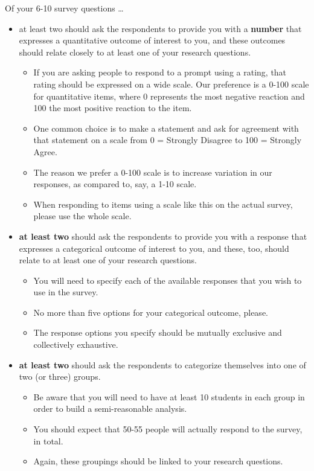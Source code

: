 \documentclass[]{book}
\providecommand{\tightlist}{%
  \setlength{\itemsep}{0pt}\setlength{\parskip}{0pt}}
\theoremstyle{definition}
\theoremstyle{definition}
\theoremstyle{definition}
\theoremstyle{remark}
\begin{document}
Of your 6-10 survey questions \ldots{}

\begin{itemize}
\tightlist
\item
  at least two should ask the respondents to provide you with a
  \textbf{number} that expresses a quantitative outcome of interest to
  you, and these outcomes should relate closely to at least one of your
  research questions.

  \begin{itemize}
  \tightlist
  \item
    If you are asking people to respond to a prompt using a rating, that
    rating should be expressed on a wide scale. Our preference is a
    0-100 scale for quantitative items, where 0 represents the most
    negative reaction and 100 the most positive reaction to the item.
  \item
    One common choice is to make a statement and ask for agreement with
    that statement on a scale from 0 = Strongly Disagree to 100 =
    Strongly Agree.
  \item
    The reason we prefer a 0-100 scale is to increase variation in our
    responses, as compared to, say, a 1-10 scale.
  \item
    When responding to items using a scale like this on the actual
    survey, please use the whole scale.
  \end{itemize}
\item
  \textbf{at least two} should ask the respondents to provide you with a
  response that expresses a categorical outcome of interest to you, and
  these, too, should relate to at least one of your research questions.

  \begin{itemize}
  \tightlist
  \item
    You will need to specify each of the available responses that you
    wish to use in the survey.
  \item
    No more than five options for your categorical outcome, please.
  \item
    The response options you specify should be mutually exclusive and
    collectively exhaustive.
  \end{itemize}
\item
  \textbf{at least two} should ask the respondents to categorize
  themselves into one of two (or three) groups.

  \begin{itemize}
  \tightlist
  \item
    Be aware that you will need to have at least 10 students in each
    group in order to build a semi-reasonable analysis.
  \item
    You should expect that 50-55 people will actually respond to the
    survey, in total.
  \item
    Again, these groupings should be linked to your research questions.
  \end{itemize}
\end{itemize}
\end{document}
